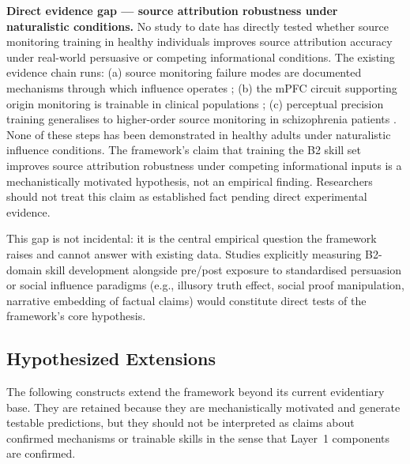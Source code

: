 \documentclass[12pt, a4paper]{article}
\begin{document}
\medskip\noindent
\textbf{Direct evidence gap --- source attribution robustness under naturalistic conditions.}
No study to date has directly tested whether source monitoring training in healthy
individuals improves source attribution accuracy under real-world persuasive or
competing informational conditions.
The existing evidence chain runs: (a) source monitoring failure modes are documented
mechanisms through which influence operates \citep{johnson1993, mitchell2009};
(b) the mPFC circuit supporting origin monitoring is trainable in clinical
populations \citep{subramaniam2012}; (c) perceptual precision training generalises
to higher-order source monitoring in schizophrenia patients \citep{subramaniam2012}.
None of these steps has been demonstrated in healthy adults under naturalistic
influence conditions. The framework's claim that training the B2 skill set
improves source attribution robustness under competing informational inputs is a
mechanistically motivated hypothesis, not an empirical finding. Researchers should
not treat this claim as established fact pending direct experimental evidence.

This gap is not incidental: it is the central empirical question the framework
raises and cannot answer with existing data. Studies explicitly measuring B2-domain
skill development alongside pre/post exposure to standardised persuasion or
social influence paradigms (e.g., illusory truth effect, social proof manipulation,
narrative embedding of factual claims) would constitute direct tests of the
framework's core hypothesis.

\subsection{Hypothesized Extensions}

The following constructs extend the framework beyond its current evidentiary base.
They are retained because they are mechanistically motivated and generate testable
predictions, but they should not be interpreted as claims about confirmed mechanisms
or trainable skills in the sense that Layer~1 components are confirmed.
\end{document}
